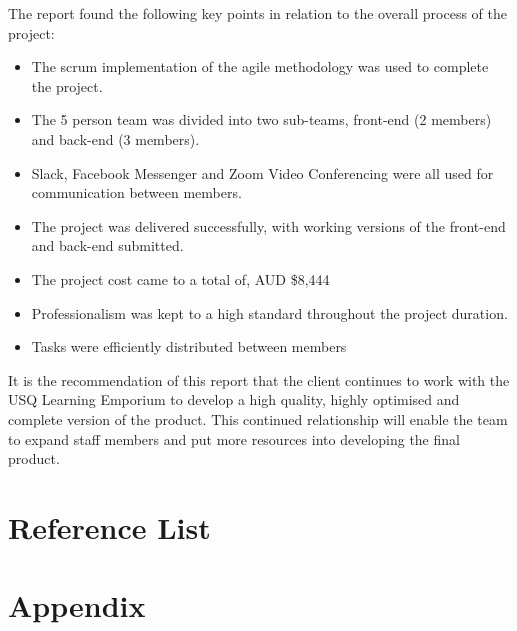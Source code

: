 \documentclass[11pt]{article}
\begin{document}
The report found the following key points in relation to the overall process of the project: 

\begin{itemize}
\item The scrum implementation of the agile methodology was used to complete the project.
\item The 5 person team was divided into two sub-teams, front-end (2 members) and back-end (3 members).
\item Slack, Facebook Messenger and Zoom Video Conferencing were all used for communication between members.
\item The project was delivered successfully, with working versions of the front-end and back-end submitted.
\item The project cost came to a total of, AUD \$8,444
\item Professionalism was kept to a high standard throughout the project duration.
\item Tasks were efficiently distributed between members
\end{itemize}

It is the recommendation of this report that the client continues to work with the USQ Learning Emporium to develop a high quality, highly optimised and complete version of the product. This continued relationship will enable the team to expand staff members and put more resources into developing the final product.


\newpage


\section{Reference List}


\newpage


\section{Appendix}
\end{document}
